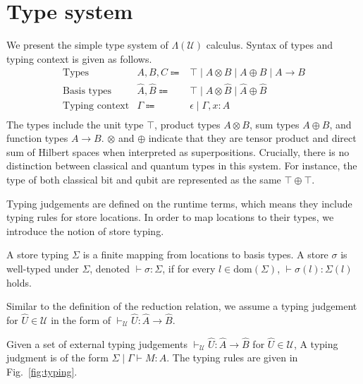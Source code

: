 \section{Type system} \label{sec:type-system}
We present the simple type system of $\Lambda(\mathcal{U})$ calculus.
Syntax of types and typing context is given as follows.
\begin{equation*}
  \begin{array}{lrl}
    \text{Types}          & A, B, C \Coloneqq          & \top\mid A\otimes B\mid A\oplus B\mid A\rightarrow B    \\
    \text{Basis types}    & \hat{A}, \hat{B} \Coloneqq & \top\mid\hat{A}\otimes \hat{B}\mid\hat{A}\oplus \hat{B} \\
    \text{Typing context} & \Gamma \Coloneqq           & \epsilon \mid \Gamma,x:A                                \\
  \end{array}
\end{equation*}
The types include the unit type $\top$, product types $A \otimes B$, sum types $A \oplus B$, and function types $A \rightarrow B$.
$\otimes$ and $\oplus$ indicate that they are tensor product and direct sum of Hilbert spaces when interpreted as superpositions.
Crucially, there is no distinction between classical and quantum types in this system.
For instance, the type of both classical bit and qubit are represented as the same $\top \oplus \top$.

Typing judgements are defined on the runtime terms, which means they include typing rules for store locations.
In order to map locations to their types, we introduce the notion of store typing.
\begin{dfn}
  A store typing $\Sigma$ is a finite mapping from locations to basis types.
  A store $\sigma$ is well-typed under $\Sigma$, denoted $\vdash \sigma : \Sigma$, if for every $l\in\text{dom}(\Sigma)$, $\vdash \sigma(l) : \Sigma(l)$ holds.
\end{dfn}

Similar to the definition of the reduction relation, we assume a typing judgement for $\hat{U}\in\mathcal{U}$ in the form of $\vdash_\mathcal{U} \hat{U} : \hat{A} \rightarrow \hat{B}$.
\begin{dfn}
  Given a set of external typing judgements $\vdash_\mathcal{U} \hat{U} : \hat{A} \rightarrow \hat{B}$ for $\hat{U}\in\mathcal{U}$,
  A typing judgment is of the form $\Sigma \mid \Gamma \vdash M : A$.
  The typing rules are given in Fig.~\ref{fig:typing}.
\end{dfn}

